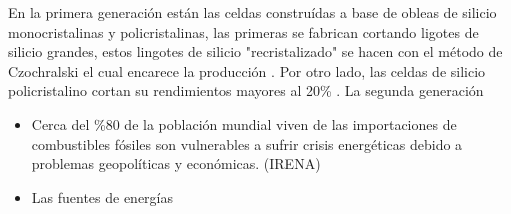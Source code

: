 En la primera generación están las celdas construídas a base de obleas de silicio monocristalinas y policristalinas, las primeras se fabrican cortando ligotes
de silicio grandes, estos lingotes de silicio "recristalizado" se hacen con el método de Czochralski \cite{yu2019growth} el cual encarece la producción \cite{srinivas2015review}. 
Por otro lado, las celdas de silicio policristalino
cortan  su rendimientos mayores al
20\% \cite{gul2016}. La segunda generación 






\begin{itemize}
    \item Cerca del \%80 de la población mundial viven de las importaciones 
     de combustibles fósiles son vulnerables a sufrir crisis energéticas
     debido a problemas geopolíticas y económicas.
     (IRENA)
    
    \item Las fuentes de energías 
\end{itemize}
